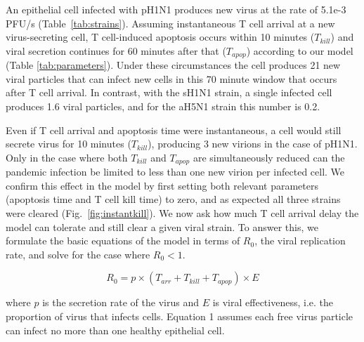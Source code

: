 \documentclass[preprint,10pt,numbers]{elsarticle}
\begin{document}
An epithelial cell infected with pH1N1 produces new virus at the rate of 5.1e-3 PFU/s (Table~\ref{tab:strains}).  Assuming instantaneous T cell arrival at a new virus-secreting cell, T cell-induced apoptosis occurs within 10 minutes ($T_{kill}$) and viral secretion continues for 60 minutes after that ($T_{apop}$) according to our model (Table \ref{tab:parameters}).  Under these circumstances the cell produces 21 new viral particles that can infect new cells in this 70 minute window that occurs after T cell arrival.  In contrast, with the sH1N1 strain, a single infected cell produces 1.6 viral particles, and for the aH5N1 strain this number is 0.2.  %

Even if T cell arrival and apoptosis time were instantaneous, a cell would still secrete virus for 10 minutes ($T_{kill}$), producing 3 new virions in the case of pH1N1.  Only in the case where both $T_{kill}$ and $T_{apop}$ are simultaneously reduced can the pandemic infection be limited to less than one new virion per infected cell.  We confirm this effect in the model by first setting both relevant parameters (apoptosis time and T cell kill time) to zero, and as expected all three strains were cleared (Fig.~\ref{fig:instantkill}).  We now ask how much T cell arrival delay the model can tolerate and still clear a given viral strain.  To answer this, we formulate the basic equations of the model in terms of $R_0$, the viral replication rate, and solve for the case where $R_0 < 1$.

\begin{equation*}
R_0 = p \times (T_{arr} + T_{kill} + T_{apop}) \times E
\tag{Eq. 3}
\end{equation*}

\noindent where $p$ is the secretion rate of the virus and $E$ is viral effectiveness, i.e. the proportion of virus that infects cells.  Equation 1 assumes each free virus particle can infect no more than one healthy epithelial cell.

\end{document}
